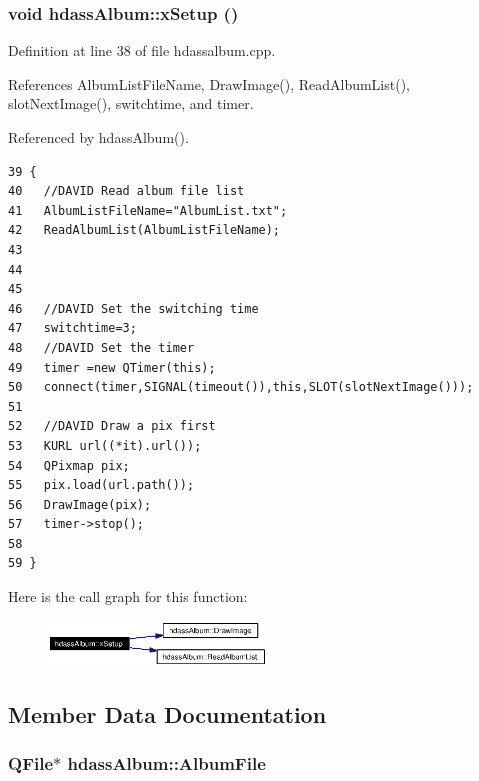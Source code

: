 \subsubsection{\setlength{\rightskip}{0pt plus 5cm}void hdass\-Album::x\-Setup ()}\label{classhdassAlbum_ImageDetiala2}




Definition at line 38 of file hdassalbum.cpp.

References Album\-List\-File\-Name, Draw\-Image(), Read\-Album\-List(), slot\-Next\-Image(), switchtime, and timer.

Referenced by hdass\-Album().



\footnotesize\begin{verbatim}39 {
40   //DAVID Read album file list 
41   AlbumListFileName="AlbumList.txt";
42   ReadAlbumList(AlbumListFileName);
43   
44  
45 
46   //DAVID Set the switching time
47   switchtime=3;
48   //DAVID Set the timer
49   timer =new QTimer(this);
50   connect(timer,SIGNAL(timeout()),this,SLOT(slotNextImage()));
51   
52   //DAVID Draw a pix first
53   KURL url((*it).url());
54   QPixmap pix;
55   pix.load(url.path());
56   DrawImage(pix);
57   timer->stop();
58   
59 }
\end{verbatim}\normalsize 


Here is the call graph for this function:\begin{figure}[H]
\begin{center}
\leavevmode
\includegraphics[width=164pt]{classhdassAlbum_ImageDetiala2_cgraph}
\end{center}
\end{figure}


\subsection{Member Data Documentation}
\subsubsection{\setlength{\rightskip}{0pt plus 5cm}QFile$\ast$ {\bf hdass\-Album::Album\-File}\hspace{0.3cm}{\tt  [private]}}\label{classhdassAlbum_hdassAlbumr2}




